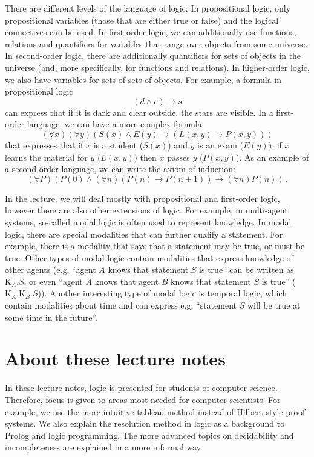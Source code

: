 There are different levels of the language of logic. In propositional logic, only propositional variables (those that are either true or false) and the logical connectives can be used. In first-order logic, we can additionally use functions, relations and quantifiers for variables that range over objects from some universe. In second-order logic, there are additionally quantifiers for sets of objects in the universe (and, more specifically, for functions and relations). In higher-order logic, we also have variables for sets of sets of objects. For example, a formula in propositional logic $$ (d \land c) \to s$$ can express that if it is dark and clear outside, the stars are visible. In a first-order language, we can have a more complex formula $$ (\forall x)(\forall y)(S(x) \land E(y) \to (L(x,y) \to P(x, y)))$$ that expresses that if $x$ is a student ($S(x)$) and $y$ is an exam ($E(y)$), if $x$ learns the material for $y$ ($L(x,y)$) then $x$ passes $y$ ($P(x,y)$). As an example of a second-order language, we can write the axiom of induction: $$ (\forall P)(P(0) \land (\forall n)(P(n) \to P(n+1)) \to (\forall n)P(n))\,.$$

In the lecture, we will deal mostly with propositional and first-order logic, however there are also other extensions of logic. For example, in multi-agent systems, so-called modal logic is often used to represent knowledge. In modal logic, there are special modalities that can further qualify a statement. For example, there is a modality that says that a statement may be true, or must be true. Other types of modal logic contain modalities that express knowledge of other agents (e.g. ``agent $A$ knows that statement $S$ is true'' can be written as $\mathrm{K}_A.S$, or even ``agent $A$ knows that agent $B$ knows that statement $S$ is true'' ($\mathrm{K}_A.\mathrm{K}_B.S$)). Another interesting type of modal logic is temporal logic, which contain modalities about time and can express e.g. ``statement $S$ will be true at some time in the future''.

\section{About these lecture notes}

In these lecture notes, logic is presented for students of computer science. Therefore, focus is given to areas most needed for computer scientists. For example, we use the more intuitive tableau method instead of Hilbert-style proof systems. We also explain the resolution method in logic as a background to Prolog and logic programming. The more advanced topics on decidability and incompleteness are explained in a more informal way.

